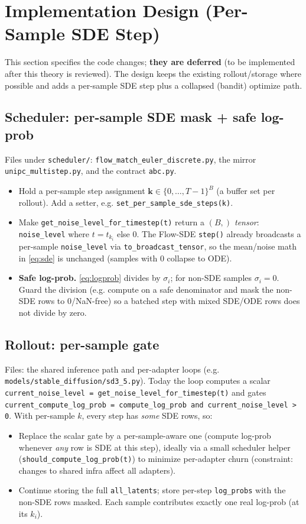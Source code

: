\documentclass[11pt]{article}
\theoremstyle{plain}
\theoremstyle{remark}
\begin{document}
\section{Implementation Design (Per-Sample SDE Step)}
\label{sec:impl}

This section specifies the code changes; \textbf{they are deferred} (to be implemented
after this theory is reviewed). The design keeps the existing rollout/storage where
possible and adds a per-sample SDE step plus a collapsed (bandit) optimize path.

\subsection{Scheduler: per-sample SDE mask + safe log-prob}
Files under \texttt{scheduler/}: \texttt{flow\_match\_euler\_discrete.py}, the mirror
\texttt{unipc\_multistep.py}, and the contract \texttt{abc.py}.
\begin{itemize}[leftmargin=1.5em]
  \item Hold a per-sample step assignment $\bm k\in\{0,\dots,T-1\}^{B}$ (a buffer set per
  rollout). Add a setter, e.g. \texttt{set\_per\_sample\_sde\_steps(k)}.
  \item Make \texttt{get\_noise\_level\_for\_timestep(t)} return a \emph{$(B,)$ tensor}:
  \texttt{noise\_level} where $t=t_{k_i}$ else $0$. The Flow-SDE \texttt{step()} already
  broadcasts a per-sample \texttt{noise\_level} via \texttt{to\_broadcast\_tensor}, so the
  mean/noise math in \eqref{eq:sde} is unchanged (samples with $0$ collapse to ODE).
  \item \textbf{Safe log-prob.} \eqref{eq:logprob} divides by $\sigma_i$; for non-SDE
  samples $\sigma_i{=}0$. Guard the division (e.g. compute on a safe denominator and mask
  the non-SDE rows to $0$/NaN-free) so a batched step with mixed SDE/ODE rows does not
  divide by zero.
\end{itemize}

\subsection{Rollout: per-sample gate}
Files: the shared inference path and per-adapter loops (e.g.
\texttt{models/stable\_diffusion/sd3\_5.py}). Today the loop computes a scalar
\texttt{current\_noise\_level = get\_noise\_level\_for\_timestep(t)} and gates
\texttt{current\_compute\_log\_prob = compute\_log\_prob and current\_noise\_level > 0}.
With per-sample $k$, every step has \emph{some} SDE rows, so:
\begin{itemize}[leftmargin=1.5em]
  \item Replace the scalar gate by a per-sample-aware one (compute log-prob whenever
  \emph{any} row is SDE at this step), ideally via a small scheduler helper
  (\texttt{should\_compute\_log\_prob(t)}) to minimize per-adapter churn (constraint:
  changes to shared infra affect all adapters).
  \item Continue storing the full \texttt{all\_latents}; store per-step
  \texttt{log\_probs} with the non-SDE rows masked. Each sample contributes exactly one
  real log-prob (at its $k_i$).
\end{itemize}
\end{document}
